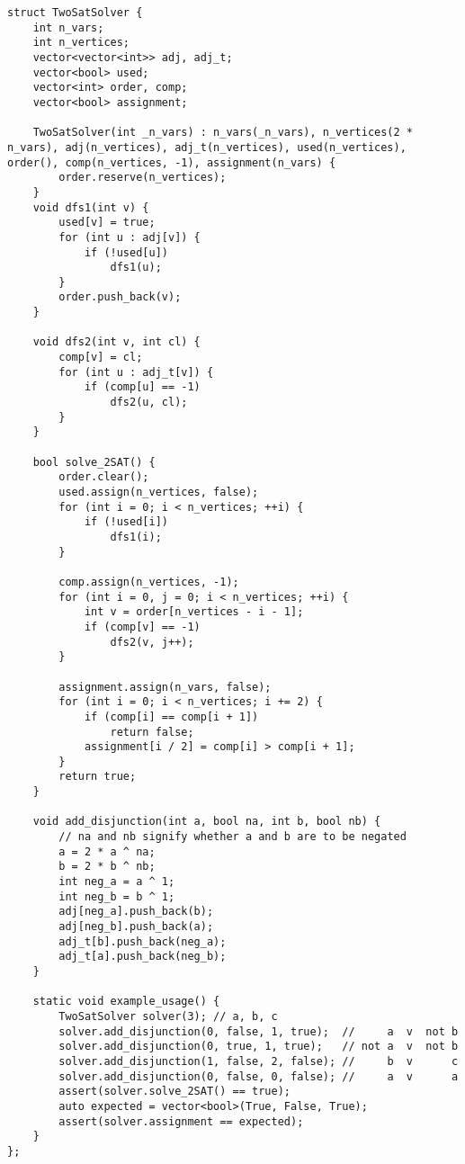 \documentclass[10pt]{article}
\begin{document}
\begin{multicols*}{2}
\begin{lstlisting}[style=compactcpp]
struct TwoSatSolver {
    int n_vars;
    int n_vertices;
    vector<vector<int>> adj, adj_t;
    vector<bool> used;
    vector<int> order, comp;
    vector<bool> assignment;

    TwoSatSolver(int _n_vars) : n_vars(_n_vars), n_vertices(2 * n_vars), adj(n_vertices), adj_t(n_vertices), used(n_vertices), order(), comp(n_vertices, -1), assignment(n_vars) {
        order.reserve(n_vertices);
    }
    void dfs1(int v) {
        used[v] = true;
        for (int u : adj[v]) {
            if (!used[u])
                dfs1(u);
        }
        order.push_back(v);
    }

    void dfs2(int v, int cl) {
        comp[v] = cl;
        for (int u : adj_t[v]) {
            if (comp[u] == -1)
                dfs2(u, cl);
        }
    }

    bool solve_2SAT() {
        order.clear();
        used.assign(n_vertices, false);
        for (int i = 0; i < n_vertices; ++i) {
            if (!used[i])
                dfs1(i);
        }

        comp.assign(n_vertices, -1);
        for (int i = 0, j = 0; i < n_vertices; ++i) {
            int v = order[n_vertices - i - 1];
            if (comp[v] == -1)
                dfs2(v, j++);
        }

        assignment.assign(n_vars, false);
        for (int i = 0; i < n_vertices; i += 2) {
            if (comp[i] == comp[i + 1])
                return false;
            assignment[i / 2] = comp[i] > comp[i + 1];
        }
        return true;
    }

    void add_disjunction(int a, bool na, int b, bool nb) {
        // na and nb signify whether a and b are to be negated 
        a = 2 * a ^ na;
        b = 2 * b ^ nb;
        int neg_a = a ^ 1;
        int neg_b = b ^ 1;
        adj[neg_a].push_back(b);
        adj[neg_b].push_back(a);
        adj_t[b].push_back(neg_a);
        adj_t[a].push_back(neg_b);
    }

    static void example_usage() {
        TwoSatSolver solver(3); // a, b, c
        solver.add_disjunction(0, false, 1, true);  //     a  v  not b
        solver.add_disjunction(0, true, 1, true);   // not a  v  not b
        solver.add_disjunction(1, false, 2, false); //     b  v      c
        solver.add_disjunction(0, false, 0, false); //     a  v      a
        assert(solver.solve_2SAT() == true);
        auto expected = vector<bool>(True, False, True);
        assert(solver.assignment == expected);
    }
};
\end{lstlisting}


\end{multicols*}
\end{document}
